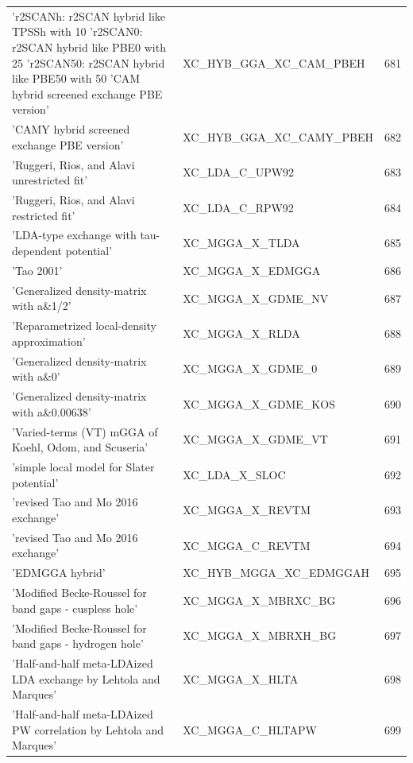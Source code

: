 \documentclass[final,12pt,makeidx,DIV=calc]{article}
\begin{document}
{{{\begin{table}[!h]
\begin{center}
\begin{tabular}{llr}
  'r2SCANh: r2SCAN hybrid like TPSSh with 10%
  'r2SCAN0: r2SCAN hybrid like PBE0 with 25%
  'r2SCAN50: r2SCAN hybrid like PBE50 with 50%
  'CAM hybrid screened exchange PBE version' & XC\_HYB\_GGA\_XC\_CAM\_PBEH  &681\\
  'CAMY hybrid screened exchange PBE version' & XC\_HYB\_GGA\_XC\_CAMY\_PBEH  &682\\
  'Ruggeri, Rios, and Alavi unrestricted fit' & XC\_LDA\_C\_UPW92  &683\\
  'Ruggeri, Rios, and Alavi restricted fit' & XC\_LDA\_C\_RPW92  &684\\
  'LDA-type exchange with tau-dependent potential' & XC\_MGGA\_X\_TLDA  &685\\
  'Tao 2001' & XC\_MGGA\_X\_EDMGGA  &686\\
  'Generalized density-matrix with a\&1/2' & XC\_MGGA\_X\_GDME\_NV  &687\\
  'Reparametrized local-density approximation' & XC\_MGGA\_X\_RLDA  &688\\
  'Generalized density-matrix with a\&0' & XC\_MGGA\_X\_GDME\_0  &689\\
  'Generalized density-matrix with a\&0.00638' & XC\_MGGA\_X\_GDME\_KOS  &690\\
  'Varied-terms (VT) mGGA of Koehl, Odom, and Scuseria' & XC\_MGGA\_X\_GDME\_VT  &691\\
  'simple local model for Slater potential' & XC\_LDA\_X\_SLOC  &692\\
  'revised Tao and Mo 2016 exchange' & XC\_MGGA\_X\_REVTM  &693\\
  'revised Tao and Mo 2016 exchange' & XC\_MGGA\_C\_REVTM  &694\\
  'EDMGGA hybrid' & XC\_HYB\_MGGA\_XC\_EDMGGAH  &695\\
  'Modified Becke-Roussel for band gaps - cuspless hole' & XC\_MGGA\_X\_MBRXC\_BG  &696\\
  'Modified Becke-Roussel for band gaps - hydrogen hole' & XC\_MGGA\_X\_MBRXH\_BG  &697\\
  'Half-and-half meta-LDAized LDA exchange by Lehtola and Marques' & XC\_MGGA\_X\_HLTA  &698\\
  'Half-and-half meta-LDAized PW correlation by Lehtola and Marques' & XC\_MGGA\_C\_HLTAPW  &699\\

\end{tabular}
\end{center}
\end{table}}}}
\end{document}
